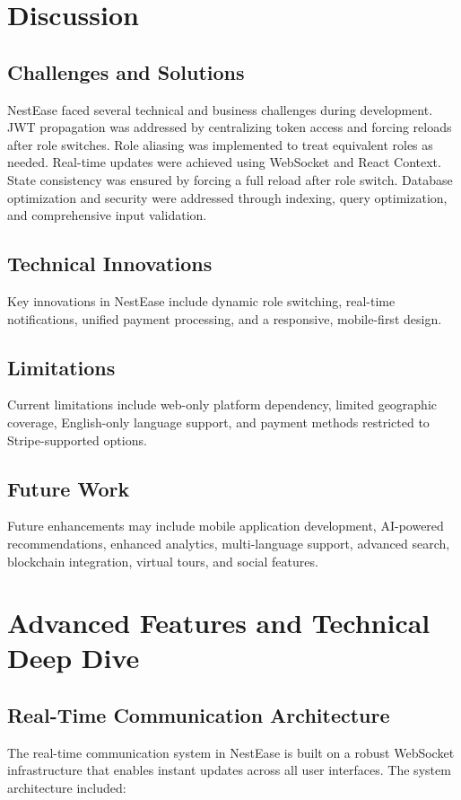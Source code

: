 \documentclass[conference]{IEEEtran}
\begin{document}
\section{Discussion}
\subsection{Challenges and Solutions}
NestEase faced several technical and business challenges during development. JWT propagation was addressed by centralizing token access and forcing reloads after role switches. Role aliasing was implemented to treat equivalent roles as needed. Real-time updates were achieved using WebSocket and React Context. State consistency was ensured by forcing a full reload after role switch. Database optimization and security were addressed through indexing, query optimization, and comprehensive input validation.

\subsection{Technical Innovations}
Key innovations in NestEase include dynamic role switching, real-time notifications, unified payment processing, and a responsive, mobile-first design.

\subsection{Limitations}
Current limitations include web-only platform dependency, limited geographic coverage, English-only language support, and payment methods restricted to Stripe-supported options.

\subsection{Future Work}
Future enhancements may include mobile application development, AI-powered recommendations, enhanced analytics, multi-language support, advanced search, blockchain integration, virtual tours, and social features.

\section{Advanced Features and Technical Deep Dive}
\subsection{Real-Time Communication Architecture}
The real-time communication system in NestEase is built on a robust WebSocket infrastructure that enables instant updates across all user interfaces. The system architecture included:
\end{document}
